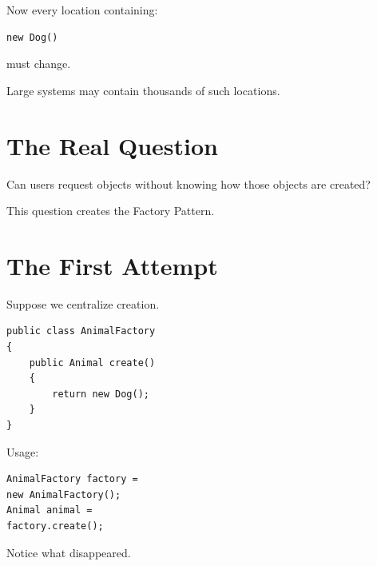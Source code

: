 \documentclass[11pt,a4paper]{book}
\begin{document}
Now every location containing:

\begin{verbatim}
new Dog()
\end{verbatim}

must change.


Large systems may contain
thousands of such locations.


\section{The Real Question}

Can users request objects
without knowing how those
objects are created?


This question creates
the Factory Pattern.


\section{The First Attempt}

Suppose we centralize creation.


\begin{verbatim}
public class AnimalFactory
{
    public Animal create()
    {
        return new Dog();
    }
}
\end{verbatim}


Usage:

\begin{verbatim}
AnimalFactory factory =
new AnimalFactory();
Animal animal =
factory.create();
\end{verbatim}


Notice what disappeared.
\end{document}
